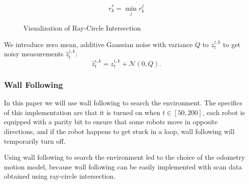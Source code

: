 \begin{equation}
r_k^*=\min_{j} r_{k}^j
\end{equation}


\begin{figure}[ht]
\centering
{}
\caption{Visualization of Ray-Circle Intersection}
\label{fig:raycirc}
\end{figure}

We introduce zero mean, additive Gaussian noise with variance $Q$ to $z_t^{i,k}$ to get noisy measurements $\hat{z}_t^{i,k}$:
\begin{equation}
\hat{z}_t^{i,k}=z_t^{i,k}+\mathcal{N}(0,Q).
\end{equation}

\subsubsection{Wall Following}

In this paper we will use wall following to search the environment.  The specifics of this implementation are that it is turned on when $t\in[50,200]$, each robot is equipped with a parity bit to ensure that some robots move in opposite directions, and if the robot happens to get stuck in a loop, wall following will temporarily turn off.

Using wall following to search the environment led to the choice of the odometry motion model, because wall following can be easily implemented with scan data obtained using ray-circle intersection.


